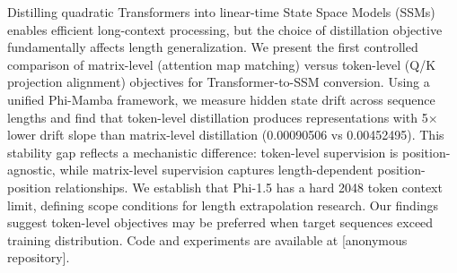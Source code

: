 Distilling quadratic Transformers into linear-time State Space Models (SSMs) enables efficient long-context processing, but the choice of distillation objective fundamentally affects length generalization. We present the first controlled comparison of matrix-level (attention map matching) versus token-level (Q/K projection alignment) objectives for Transformer-to-SSM conversion. Using a unified Phi-Mamba framework, we measure hidden state drift across sequence lengths and find that token-level distillation produces representations with 5$\times$ lower drift slope than matrix-level distillation (0.00090506 vs 0.00452495). This stability gap reflects a mechanistic difference: token-level supervision is position-agnostic, while matrix-level supervision captures length-dependent position-position relationships. We establish that Phi-1.5 has a hard 2048 token context limit, defining scope conditions for length extrapolation research. Our findings suggest token-level objectives may be preferred when target sequences exceed training distribution. Code and experiments are available at [anonymous repository].
